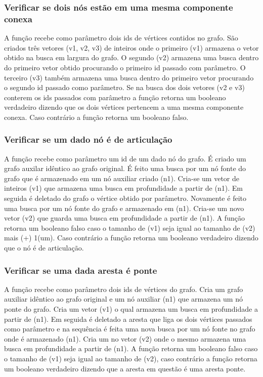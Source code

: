 \documentclass[a4paper, 12pt]{article}
\begin{document}
\subsubsection{Verificar se dois nós estão em uma mesma componente conexa}
A função recebe como parâmetro dois ids de vértices contidos no grafo. São criados três vetores (v1, v2, v3) de inteiros onde o primeiro (v1) armazena o vetor obtido na busca em largura do grafo. O segundo (v2) armazena uma busca dentro do primeiro vetor obtido procurando o primeiro id passado com parâmetro. O terceiro (v3) também armazena uma busca dentro do primeiro vetor procurando o segundo id passado como parâmetro. Se na busca dos dois vetores (v2 e v3) conterem os ids passados com parâmetro a função retorna um booleano verdadeiro dizendo que os dois vértices pertencem a uma mesma componente conexa. Caso contrário a função retorna um booleano falso. 

\subsubsection{Verificar se um dado nó é de articulação}
A função recebe como parâmetro um id de um dado nó do grafo. É criado um grafo auxilar idêntico ao grafo original. É feito uma busca por um nó fonte do grafo que é armazenado em um nó auxiliar criado (n1). Cria-se um vetor de inteiros (v1) que armazena uma busca em profundidade a partir de (n1). Em seguida é deletado do grafo o vértice obtido por parâmetro. Novamente é feito uma busca por um nó fonte do grafo e armazenado em (n1). Cria-se um novo vetor (v2) que guarda uma busca em profundidade a partir de (n1). A função retorna um booleano falso caso o tamanho de (v1) seja igual ao tamanho de (v2) mais (+) 1(um). Caso contrário a função retorna um booleano verdadeiro dizendo que o nó é de articulação.

\subsubsection{Verificar se uma dada aresta é ponte}
A função recebe como parâmetro dois ids de vértices do grafo. Cria um grafo auxiliar idêntico ao grafo original e um nó auxiliar (n1) que armazena um nó ponte do grafo. Cria um vetor (v1) o qual armazena um busca em profundidade a partir de (n1). Em seguida é deletado a aresta que liga os dois vértices passados como parâmetro e na sequência é feita uma nova busca por um nó fonte no grafo onde é armazenado (n1). Cria um no vetor (v2) onde o mesmo armazena uma busca em profundidade a partir de (n1). A função retorna um booleano falso caso o tamanho de (v1) seja igual ao tamanho de (v2), caso contrário a função retorna um booleano verdadeiro dizendo que a aresta em questão é uma aresta ponte.
\end{document}
